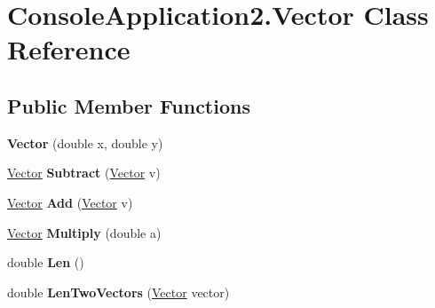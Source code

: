 \hypertarget{class_console_application2_1_1_vector}{}\section{Console\+Application2.\+Vector Class Reference}
\label{class_console_application2_1_1_vector}
\subsection*{Public Member Functions}
\begin{DoxyCompactItemize}
\item 
\hypertarget{class_console_application2_1_1_vector_a2c3bbdbecc7fbd0b1e12e842850cb41a}{}{\bfseries Vector} (double x, double y)\label{class_console_application2_1_1_vector_a2c3bbdbecc7fbd0b1e12e842850cb41a}

\item 
\hypertarget{class_console_application2_1_1_vector_a39cd2e4386c7600534f07e90f40da297}{}\hyperlink{class_console_application2_1_1_vector}{Vector} {\bfseries Subtract} (\hyperlink{class_console_application2_1_1_vector}{Vector} v)\label{class_console_application2_1_1_vector_a39cd2e4386c7600534f07e90f40da297}

\item 
\hypertarget{class_console_application2_1_1_vector_a92fe1c9da508aeb518f5da33d5429eae}{}\hyperlink{class_console_application2_1_1_vector}{Vector} {\bfseries Add} (\hyperlink{class_console_application2_1_1_vector}{Vector} v)\label{class_console_application2_1_1_vector_a92fe1c9da508aeb518f5da33d5429eae}

\item 
\hypertarget{class_console_application2_1_1_vector_a90aee8f0883398df708c1025443b6b60}{}\hyperlink{class_console_application2_1_1_vector}{Vector} {\bfseries Multiply} (double a)\label{class_console_application2_1_1_vector_a90aee8f0883398df708c1025443b6b60}

\item 
\hypertarget{class_console_application2_1_1_vector_abde9e17b0195853e84b9f7515558f533}{}double {\bfseries Len} ()\label{class_console_application2_1_1_vector_abde9e17b0195853e84b9f7515558f533}

\item 
\hypertarget{class_console_application2_1_1_vector_afccb46386f90449c592beb995fa0309c}{}double {\bfseries Len\+Two\+Vectors} (\hyperlink{class_console_application2_1_1_vector}{Vector} vector)\label{class_console_application2_1_1_vector_afccb46386f90449c592beb995fa0309c}


\end{DoxyCompactItemize}

